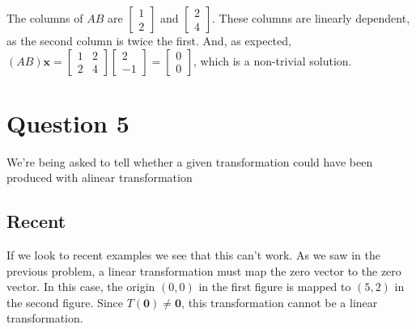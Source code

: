 \documentclass{article}
\begin{document}
                    The columns of $AB$ are $\begin{bmatrix} 1 \\ 2 \end{bmatrix}$ and $\begin{bmatrix} 2 \\ 4 \end{bmatrix}$. These columns are linearly dependent, as the second column is twice the first.
                    And, as expected, $(AB)\mathbf{x} = \begin{bmatrix} 1 & 2 \\ 2 & 4 \end{bmatrix} \begin{bmatrix} 2 \\ -1 \end{bmatrix} = \begin{bmatrix} 0 \\ 0 \end{bmatrix}$, which is a non-trivial solution.
    \section{Question 5}
        We're being asked to tell whether a given transformation
        could have been produced with alinear transformation

        \begin{center}   
        \end{center}
        \subsection{Recent}
            If we look to recent examples we see that this can't work.
            As we saw in the previous problem, 
            a linear transformation must map the zero vector to the zero vector. 
            In this case, the origin $(0,0)$ in the first figure is mapped to $(5,2)$ in the second figure. 
            Since $T(\mathbf{0}) \neq \mathbf{0}$, this transformation cannot be a linear transformation.
\end{document}
